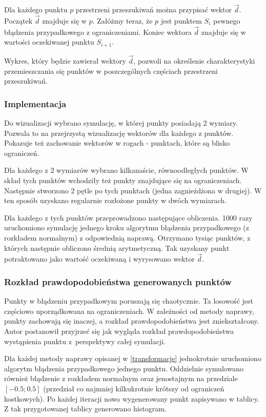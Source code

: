 \documentclass{mini}
\begin{document}
Dla każdego punktu $p$ przestrzeni przeszukiwań można przypisać wektor $\overrightarrow{d}$. Początek $\overrightarrow{d}$ znajduje się w $p$. Załóżmy teraz, że $p$ jest punktem $S_i$ pewnego błądzenia przypadkowego z ograniczeniami. Koniec wektora $\overrightarrow{d}$ znajduje się w wartości oczekiwanej punktu $S_{i+1}$.

Wykres, który będzie zawierał wektory $\overrightarrow{d}$, pozwoli na określenie charakterystyki przemieszczania się punktów w poszczególnych częściach przestrzeni przeszukiwań.

\subsubsection*{Implementacja}
Do wizualizacji wybrano symulację, w której punkty posiadają 2 wymiary. Pozwala to na przejrzystą wizualizację wektorów dla każdego z punktów. Pokazuje też zachowanie wektorów w rogach - punktach, które są blisko ograniczeń.

Dla każdego z 2 wymiarów wybrano kilkanaście, równoodległych punktów. W skład tych punktów wchodziły też punkty znajdujące się na ograniczeniach. Następnie stworzono 2 pętle po tych punktach (jedna zagnieżdżona w drugiej). W ten sposób uzyskano regularnie rozłożone punkty w dwóch wymiarach.

Dla każdego z tych punktów przeprowadzono następujące obliczenia. 1000 razy uruchomiono symulację jednego kroku algorytmu błądzenia przypadkowego (z rozkładem normalnym) z odpowiednią naprawą. Otrzymano tysiąc punktów, z których następnie obliczono średnią arytmetyczną. Tak uzyskany punkt potraktowano jako wartość oczekiwaną i wyrysowano wektor $\overrightarrow{d}$.

\subsubsection{Rozkład prawdopodobieństwa generowanych punktów}
Punkty w błądzeniu przypadkowym poruszają się chaotycznie. Ta losowość jest częściowo uporządkowana na ograniczeniach. W zależności od metody naprawy, punkty zachowują się inaczej, a rozkład prawdopodobieństwa jest zniekształcony. Autor postanowił przyjrzeć się jak wygląda rozkład prawdopodobieństwa wystąpienia punktu z~perspektywy całej symulacji.

Dla każdej metody naprawy opisanej w \ref{transformacje} jednokrotnie uruchomiono algorytm błądzenia przypadkowego jednego punktu. Oddzielnie symulowano również błądzenie z rozkładem normalnym oraz jenostajnym na przedziale $[-0.5; 0.5]$ (przedział co najmniej kilkukrotnie krótszy od ograniczeń kostkowych). Po każdej iteracji nowo wygenerowany punkt zapisywano w tablicy. Z tak przygotowanej tablicy generowano histogram.
\end{document}
